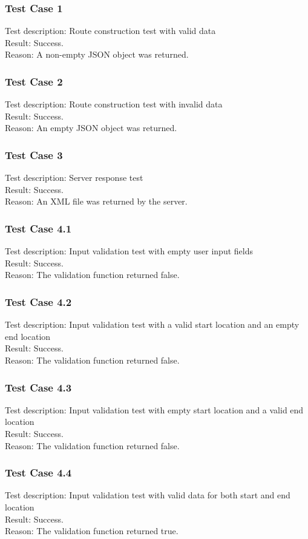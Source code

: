 \documentclass[a4paper,12pt]{article}
\begin{document}
\subsubsection{Test Case 1}
Test description: Route construction test with valid data\\
Result: Success.\\
Reason: A non-empty JSON object was returned.
\subsubsection{Test Case 2}
Test description: Route construction test with invalid data\\
Result: Success.\\
Reason: An empty JSON object was returned.
\subsubsection{Test Case 3}
Test description: Server response test\\
Result: Success.\\
Reason: An XML file was returned by the server.
\subsubsection{Test Case 4.1}
Test description: Input validation test with empty user input fields\\
Result: Success.\\
Reason: The validation function returned false.
\subsubsection{Test Case 4.2}
Test description: Input validation test with a valid start location and an empty end location\\
Result: Success.\\
Reason: The validation function returned false.
\subsubsection{Test Case 4.3}
Test description: Input validation test with empty start location and a valid end location\\
Result: Success.\\
Reason: The validation function returned false.
\subsubsection{Test Case 4.4}
Test description: Input validation test with valid data for both start and end location\\
Result: Success.\\
Reason: The validation function returned true.
\end{document}

